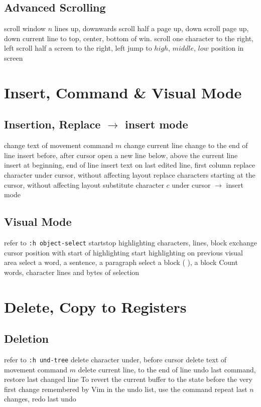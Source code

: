\subsection{Advanced Scrolling}	{}
	{scroll window $n$ lines up, downwards}
	{scroll half a page up, down}
	{scroll page up, down}
	{current line to top, center, bottom of win.}
	{scroll one character to the right, left}
	{scroll half a screen to the right, left}
	{jump to $high$, $middle$, $low$ position in screen}

\section{Insert, Command \& Visual Mode}	{}
\subsection{Insertion, Replace $\to$ insert mode}	{}
	{change text of movement command $m$}
	{change current line}
	{change to the end of line}
	{insert before, after cursor}
	{open a new line below, above the current line}
	{insert at beginning, end of line}
	{insert text on last edited line, first column}
	{replace character under cursor, without affecting layout}
	{replace characters starting at the cursor, without affecting layout}
	{substitute character $c$ under cursor $\to$ insert mode}

\subsection{Visual Mode}	{refer to {\tt :h object-select}}
	{start\or stop highlighting characters, lines, block}
	{exchange cursor position with start of highlighting}
	{start highlighting on previous visual area}
	{select a word, a sentence, a paragraph}
	{select a block ( ), a block {\tt\lapos}	{\tt\rapos}}
	{Count words, character lines and bytes of selection}

\section{Delete, Copy to Registers}	{}
\subsection{Deletion}	{refer to {\tt :h und-tree}}
	{delete character under, before cursor}
	{delete text of movement command $m$}
	{delete current line, to the end of line}
	{undo last command, restore last changed line}
	{To revert the current buffer to the state before the very
first change remembered by Vim in the undo list, use the command}
	{repeat last $n$ changes, redo last undo}

